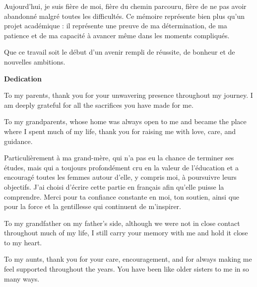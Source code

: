 \documentclass[12pt,a4paper]{report}
\begin{document}
\vspace{0.3cm}

Aujourd'hui, je suis fière de moi, fière du chemin parcouru, fière de ne pas avoir abandonné malgré toutes les difficultés. Ce mémoire représente bien plus qu'un projet académique : il représente une preuve de ma détermination, de ma patience et de ma capacité à avancer même dans les moments compliqués.

\vspace{0.3cm}

Que ce travail soit le début d'un avenir rempli de réussite, de bonheur et de nouvelles ambitions.
\newpage
\thispagestyle{fancy}

\begin{center}
    {\Large \textbf{Dedication}}
\end{center}

\vspace{0.5cm}

To my parents, thank you for your unwavering presence throughout my journey. I am deeply grateful for all the sacrifices you have made for me.

\vspace{0.3cm}

To my grandparents, whose home was always open to me and became the place where I spent much of my life, thank you for raising me with love, care, and guidance.

\vspace{0.3cm}

Particulièrement à ma grand-mère, qui n’a pas eu la chance de terminer ses études, mais qui a toujours profondément cru en la valeur de l’éducation et a encouragé toutes les femmes autour d’elle, y compris moi, à poursuivre leurs objectifs. J’ai choisi d’écrire cette partie en français afin qu’elle puisse la comprendre. Merci pour ta confiance constante en moi, ton soutien, ainsi que pour la force et la gentillesse qui continuent de m’inspirer.

\vspace{0.3cm}

To my grandfather on my father’s side, although we were not in close contact throughout much of my life, I still carry your memory with me and hold it close to my heart.

\vspace{0.3cm}

To my aunts, thank you for your care, encouragement, and for always making me feel supported throughout the years. You have been like older sisters to me in so many ways.
\end{document}
